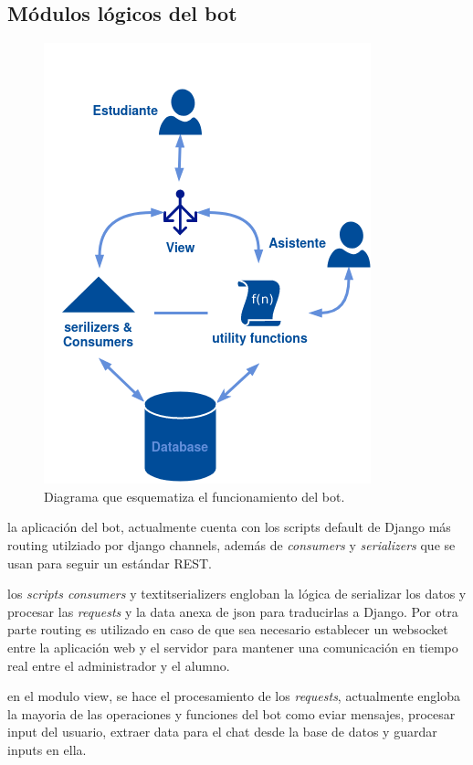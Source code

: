     \subsection{Módulos lógicos del bot}
        \begin{figure}[h!]
            \centering
            \includegraphics[scale=0.5]{media/imagenes/trabajo_previo/Bot_Modules-old.png}
            \caption[Funcionamiento del Bot]{Diagrama que esquematiza el funcionamiento del bot.}
            \label{fig:bot-work-old}
        \end{figure}
        \par la aplicación del bot, actualmente cuenta con los scripts default de Django más routing utilziado por django channels, además de \textit{consumers} y \textit{serializers} que se usan para seguir un estándar \gls{REST}.
        \par los \textit{scripts consumers} y textit{serializers} engloban la lógica de serializar los datos y procesar las \textit{requests} y la data anexa de json para traducirlas a \gls{Django}. Por otra parte routing es utilizado en caso de que sea necesario establecer un websocket entre la aplicación web y el servidor para mantener una comunicación en tiempo real entre el administrador y el alumno.
        \par en el modulo view, se hace el procesamiento de los \textit{requests}, actualmente engloba la mayoria de las operaciones y funciones del bot como eviar mensajes, procesar input del usuario, extraer data para el chat desde la base de datos y guardar inputs en ella.

